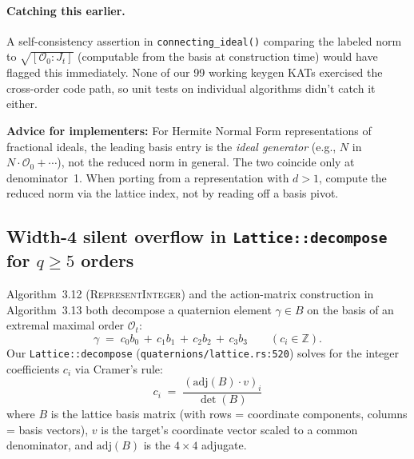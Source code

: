 \paragraph{Catching this earlier.}  A self-consistency assertion
in \texttt{connecting\_ideal()} comparing the labeled norm to
$\sqrt{[\mathcal{O}_0 : J_t]}$ (computable from the basis at
construction time) would have flagged this immediately.  None
of our 99 working keygen KATs exercised the cross-order code
path, so unit tests on individual algorithms didn't catch it
either.

\noindent
\textbf{Advice for implementers:} For Hermite Normal Form
representations of fractional ideals, the leading basis entry
is the \emph{ideal generator} (e.g., $N$ in $N \cdot
\mathcal{O}_0 + \cdots$), not the reduced norm in general.
The two coincide only at denominator~1.  When porting from a
representation with $d > 1$, compute the reduced norm via the
lattice index, not by reading off a basis pivot.

\subsection{Width-4 silent overflow in \texttt{Lattice::decompose}
  for $q \geq 5$ orders}
\label{sec:bug-decompose-width}

Algorithm~3.12 (\textsc{RepresentInteger}) and the action-matrix
construction in Algorithm~3.13 both decompose a quaternion
element $\gamma \in B$ on the basis of an extremal maximal order
$\mathcal{O}_t$:
\[
  \gamma \;=\; c_0 b_0 \,+\, c_1 b_1 \,+\, c_2 b_2 \,+\, c_3 b_3
  \qquad (c_i \in \mathbb{Z}).
\]
Our \texttt{Lattice::decompose} (\texttt{quaternions/lattice.rs:520})
solves for the integer coefficients $c_i$ via Cramer's rule:
\begin{equation*}
  c_i \;=\; \frac{(\mathrm{adj}(B) \cdot v)_i}{\det(B)}
\end{equation*}
where $B$ is the lattice basis matrix (with rows = coordinate
components, columns = basis vectors), $v$ is the target's
coordinate vector scaled to a common denominator, and
$\mathrm{adj}(B)$ is the $4 \times 4$ adjugate.

